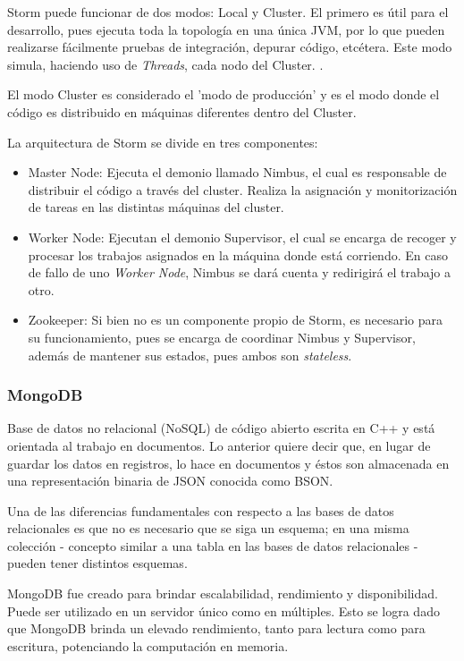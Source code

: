 Storm puede funcionar de dos modos: Local y Cluster. El primero es útil para el desarrollo, pues ejecuta toda la topología en una única JVM, por lo que pueden realizarse fácilmente pruebas de integración, depurar código, etcétera. Este modo simula, haciendo uso de \textit{Threads}, cada nodo del Cluster. \cite{Storm}.

El modo Cluster es considerado el 'modo de producción' y es el modo donde el código es distribuido en máquinas diferentes dentro del Cluster.

La arquitectura de Storm se divide en tres componentes:
\begin{itemize}
\item Master Node: Ejecuta el demonio llamado Nimbus, el cual es responsable de distribuir el código a través del cluster. Realiza la asignación y monitorización de tareas en las distintas máquinas del cluster.
\item Worker Node: Ejecutan el demonio Supervisor, el cual se encarga de recoger y procesar los trabajos asignados en la máquina donde está corriendo. En caso de fallo de uno \textit{Worker Node}, Nimbus se dará cuenta y redirigirá el trabajo a otro.
\item Zookeeper: Si bien no es un componente propio de Storm, es necesario para su funcionamiento, pues se encarga de coordinar Nimbus y Supervisor, además de mantener sus estados, pues ambos son \textit{stateless}.
\end{itemize}

\subsubsection*{MongoDB}
\label{subsubsec:mongoDB}

Base de datos no relacional (NoSQL) de código abierto escrita en C++ y está orientada al trabajo en documentos. Lo anterior quiere decir que, en lugar de guardar los datos en registros, lo hace en documentos y éstos son almacenada en una representación binaria de JSON conocida como BSON.

Una de las diferencias fundamentales con respecto a las bases de datos relacionales es que no es necesario que se siga un esquema; en una misma colección - concepto similar a una tabla en las bases de datos relacionales - pueden tener distintos esquemas.

MongoDB fue creado para brindar escalabilidad, rendimiento y disponibilidad. Puede ser utilizado en un servidor único como en múltiples. Esto se logra dado que MongoDB brinda un elevado rendimiento, tanto para lectura como para escritura, potenciando la computación en memoria.

